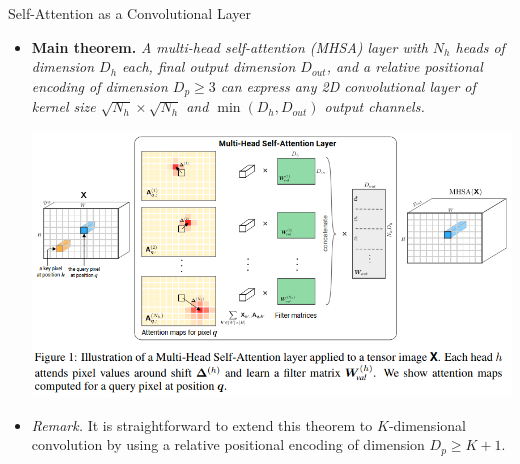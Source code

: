 \documentclass[9pt]{beamer}
\begin{document}
\begin{frame}{Self-Attention as a Convolutional Layer}
\begin{itemize}
\item \textbf{Main theorem.} \emph{A {\em multi-head self-attention} (MHSA) layer with $N_h$ heads of dimension $D_h$ each, final output dimension $D_{out}$, and a {\em relative positional encoding} of dimension $D_p\geq3$ can express any 2D convolutional layer of kernel size $\sqrt{N_h}\times\sqrt{N_h}$ and $\min(D_h, D_{out})$ output channels.}

\begin{center}
    \includegraphics[width=.8\textwidth]{presentation/images/sa_as_conv.png}
\end{center}
\vspace{-.15in}

\item \textit{Remark.} It is straightforward to extend this theorem to $K$-dimensional convolution by using a relative positional encoding of dimension $D_p\geq K+1$.
\end{itemize}
\end{frame}
\end{document}
